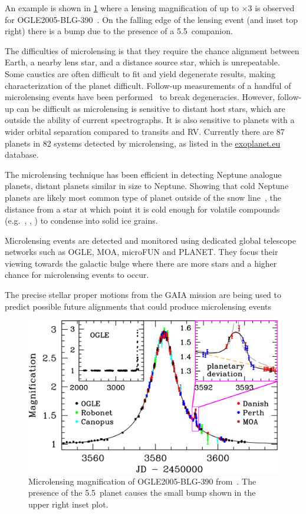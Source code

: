 An example is shown in \cref{fig:microlensing_example} where a lensing magnification of up to $\times3$ is observed for {OGLE2005-BLG-390}~\citep{beaulieu_discovery_2006}.
On the falling edge of the lensing event (and inset top right) there is a bump due to the presence of a 5.5\,\Mjup{} companion.

The difficulties of microlensing is that they require the chance alignment between Earth, a nearby lens star, and a distance source star, which is unrepeatable.
Some caustics are often difficult to fit and yield degenerate results, making characterization of the planet difficult.
Follow-up measurements of a handful of microlensing events have been performed~\citep[e.g.][]{kubas_frozen_2012, batista_confirmation_2015, santerne_spectroscopic_2016} to break degeneracies.
However, follow-up can be difficult as microlensing is sensitive to distant host stars, which are outside the ability of current spectrographs.
It is also sensitive to planets with a wider orbital separation compared to transits and {RV}.
Currently there are 87 planets in 82 systems detected by microlensing, as listed in the \href{https:\\www.exoplanet.eu}{exoplanet.eu} database.

The microlensing technique has been efficient in detecting Neptune analogue planets, distant planets similar in size to Neptune.
Showing that cold Neptune planets are likely most common type of planet outside of the snow line~\citep{suzuki_exoplanet_2016}, the distance from a star at which point it is cold enough for volatile compounds (e.g.\ , , ) to condense into solid ice grains.

Microlensing events are detected and monitored using dedicated global telescope networks such as {OGLE}, {MOA}, {microFUN} and {PLANET}.
They focus their viewing towards the galactic bulge where there are more stars and a higher chance for microlensing events to occur.

The precise stellar proper motions from the GAIA mission are being used to predict possible future alignments that could produce microlensing events~\citep{kluter_prediction_2018}

\begin{figure}
    \centering
    \includegraphics[width=0.5\linewidth]{./figures/introduction/Microlensing_OGLE2005-BLG-390.pdf}
    \caption[Microlensing magnification of OGLE2005-BLG-390.]{Microlensing magnification of OGLE2005-BLG-390 from~\citep{beaulieu_discovery_2006}.
    The presence of the 5.5\,\Mjup{} planet causes the small bump shown in the upper right inset plot.}
    \label{fig:microlensing_example}
\end{figure}

